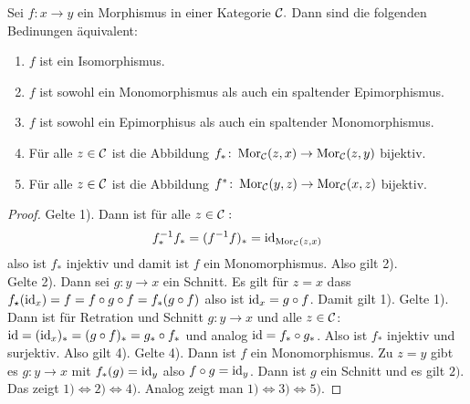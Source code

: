 \begin{Lemma}
    Sei \(f\colon x\to y\) ein Morphismus in einer Kategorie \(\mathcal{C}.\) Dann sind die folgenden Bedinungen äquivalent:
    \begin{enumerate}
        \item \(f\) ist ein Isomorphismus.
        \item \(f\) ist sowohl ein Monomorphismus als auch ein spaltender Epimorphismus.
        \item \(f\) ist sowohl ein Epimorphisus als auch ein spaltender Monomorphismus.
         
        \item Für alle \(z\in\mathcal{C}\) ist die Abbildung \(f_*\colon\operatorname{Mor}_{\mathcal{C}}(z,x)\to\operatorname{Mor}_{\mathcal{C}}(z,y)\) bijektiv.
        \item Für alle \(z\in\mathcal{C}\) ist die Abbildung \(f^*\colon \operatorname{Mor}_{\mathcal{C}}(y,z)\to \operatorname{Mor}_{\mathcal{C}}(x,z)\) bijektiv.
       
    \end{enumerate}
\end{Lemma}
\begin{proof}
    Gelte 1). Dann ist für alle \(z\in\mathcal{C}:\) \[f^{-1}_*f_*=(f^{-1}f)_*=\mathrm{id}_{\operatorname{Mor}_{\mathcal{C}}(z,x)}\] also ist \(f_*\) injektiv und damit ist \(f\) ein Monomorphismus. Also gilt 2).\\
    Gelte 2). Dann sei \(g\colon y\to x\) ein Schnitt.
    Es gilt für \(z=x\) dass \(f_\star (\mathrm{id}_x)=f=f\circ g\circ f=f_*(g\circ f)\) also ist \(\mathrm{id}_x=g\circ f\). Damit gilt 1).
    Gelte 1). Dann ist für Retration und Schnitt \(g\colon y\to x\) und alle \(z\in\mathcal{C}\):
    \(\mathrm{id}=(\mathrm{id}_x)_*=(g\circ f)_*=g_*\circ f_*\) und analog
    \(\mathrm{id}=f_*\circ g_*\). Also ist \(f_*\) injektiv und surjektiv. Also gilt 4).
    Gelte 4). Dann ist \(f\) ein Monomorphismus. Zu \(z=y\) gibt es \(g\colon y\to x\) mit \(f_*(g)=\mathrm{id}_y\) also \(f\circ g=\mathrm{id}_y\). Dann ist \(g\) ein Schnitt und es gilt \(2).\)
    Das zeigt \(1)\iff 2)\iff 4)\). Analog zeigt man \(1)\iff 3)\iff 5).\)
\end{proof}
